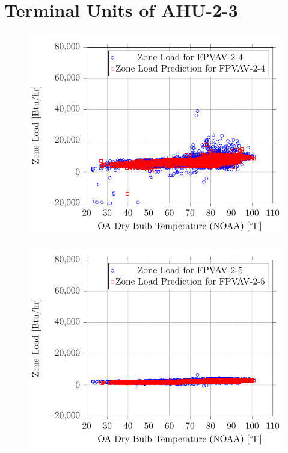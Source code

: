 \section{Terminal Units of AHU-2-3}

\begin{figure}
\centering
\includegraphics[]{Plots/15/2017-06-27-1319-BtuhrvsOADryBulbTemperatureNOAAF.pdf}
\caption{}
\label{fig:2017-06-27-1319-BtuhrvsOADryBulbTemperatureNOAAF}
\end{figure}

\begin{figure}
\centering
\includegraphics[]{Plots/16/2017-06-27-1322-BtuhrvsOADryBulbTemperatureNOAAF.pdf}
\caption{}
\label{fig:2017-06-27-1322-BtuhrvsOADryBulbTemperatureNOAAF}
\end{figure}


